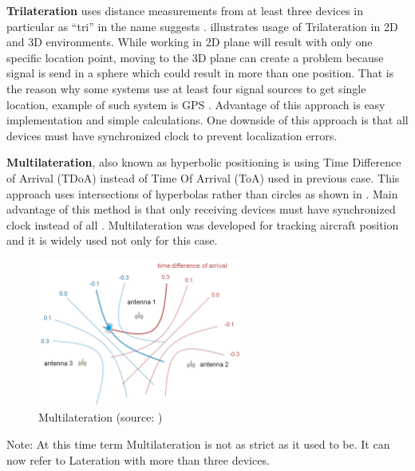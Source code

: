 \textbf{Trilateration} uses distance measurements from at least three devices in particular as \enquote{tri} in the name suggests \cite{RAinWILTaS}.  illustrates usage of Trilateration in 2D and 3D environments. While working in 2D plane will result with only one specific location point, moving to the 3D plane can create a problem because signal is send in a sphere which could result in more than one position. That is the reason why some systems use at least four signal sources to get single location, example of such system is GPS \cite{GNSSGPS}. Advantage of this approach is easy implementation and simple calculations. One downside of this approach is that all devices must have synchronized clock \cite{RAinWILTaS} to prevent localization errors.

\medskip

\textbf{Multilateration}, also known as hyperbolic positioning is using Time Difference of Arrival (TDoA) instead of Time Of Arrival (ToA) used in previous case. This approach uses intersections of hyperbolas rather than circles as shown in . Main advantage of this method is that only receiving devices must have synchronized clock instead of all \cite{PLTaA}. Multilateration was developed for tracking aircraft position and it is widely used not only for this case.

\begin{figure}[h!]
	\begin{centering}
		\includegraphics[width=0.6\textwidth]{img/multilateration}
		\par\end{centering}
	\caption{Multilateration (source: \cite{HPwAA})\label{fig:Multilateration}}
	\label{fig02c02}
\end{figure}

Note: At this time term Multilateration is not as strict as it used to be. It can now refer to Lateration with more than three devices.

